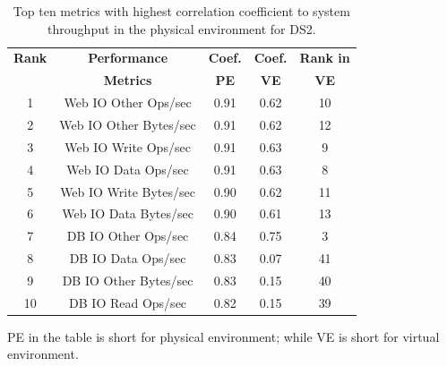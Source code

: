 \begin{table}[tbh]
	\centering
	\caption{Top ten metrics with highest correlation coefficient to system throughput in the physical environment for DS2. }
	\label{tab:top10ds2p}
	\begin{threeparttable}
	
		\begin{tabular}{|c||c|c|c|c|}
			\hline
			\textbf{Rank} & \textbf{Performance } & \textbf{Coef. } & \textbf{Coef. } & \textbf{Rank in} \\ %
			 & \textbf{ Metrics} & \textbf{PE} & \textbf{VE} & \textbf{VE} \\ %
			\midrule
			1 & Web IO Other Ops/sec & 0.91 & 0.62 & 10 \\ \hline
			2 & Web IO Other Bytes/sec & 0.91 & 0.62 & 12 \\ \hline
			3 & Web IO Write Ops/sec & 0.91 & 0.63 & 9 \\ \hline
			4 & Web IO Data Ops/sec & 0.91 & 0.63 & 8 \\ \hline
			5 & Web IO Write Bytes/sec & 0.90 & 0.62 & 11 \\ \hline
			6 & Web IO Data Bytes/sec & 0.90 & 0.61 & 13 \\ \hline
			7 & DB IO Other Ops/sec & 0.84 & 0.75 & 3 \\ \hline
			8 & DB IO Data Ops/sec & 0.83 & 0.07 & 41 \\ \hline
			9 & DB IO Other Bytes/sec & 0.83 & 0.15 & 40 \\ \hline
			10 & DB IO Read Ops/sec & 0.82 & 0.15 & 39 \\ \hline
		\end{tabular}%
		\begin{tablenotes}
			\item PE in the table is short for physical environment; while VE is short for virtual environment.
		\end{tablenotes}
		\end{threeparttable}
	
	
\end{table}

